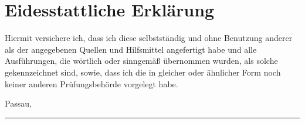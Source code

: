 \chapter{Eidesstattliche Erklärung}

	Hiermit versichere ich, dass ich diese \thesisType{} selbstständig und ohne Benutzung anderer als der angegebenen Quellen und Hilfsmittel angefertigt habe und alle Ausführungen, die wörtlich oder sinngemäß übernommen wurden, als solche gekennzeichnet sind, sowie, dass ich die \thesisType{} in gleicher oder ähnlicher Form noch keiner anderen Prüfungsbehörde vorgelegt habe.

	\vspace{3cm}

	Passau, \thedate

	\vspace{2cm}

	\parbox{8cm}{
		\hrule \strut \theauthor
	}
